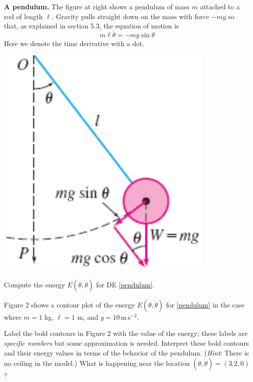 \documentclass[12pt]{article}
\theoremstyle{definition}
\begin{document}
\medskip
\begin{minipage}[t]{0.65\textwidth}
\textbf{A pendulum.}  The figure at right shows a pendulum of mass $m$ attached to a rod of length $\ell$.  Gravity pulls straight down on the mass with force $-mg$ so that, as explained in section 5.3, the equation of motion is
\begin{equation}
m \ell \ddot{\theta} = -m g \sin\theta  \label{pendulum}
\end{equation}
Here we denote the time derivative with a dot.

\end{minipage}
\begin{minipage}[t]{0.35\textwidth}
\vspace{0pt}

\hfill \includegraphics[width=0.8\textwidth]{figs/pendulum}
\end{minipage}

\begin{prob}
Compute the energy $E(\theta,\dot\theta)$ for DE \eqref{pendulum}.
\end{prob}

Figure 2 shows a contour plot of the energy $E(\theta,\dot\theta)$ for \eqref{pendulum} in the case where $m=1$ kg, $\ell=1$ m, and $g=10 \, \text{m}\,\text{s}^{-2}$. 

\begin{prob}
Label the bold contours in Figure 2 with the value of the energy; these labels are \emph{specific numbers} but some approximation is needed.  Interpret these bold contours and their energy values in terms of the behavior of the pendulum.  (\emph{Hint}:  There is no ceiling in the model.)  What is happening near the location $(\theta,\dot\theta)=(3.2,0)$?
\end{prob}
\end{document}
